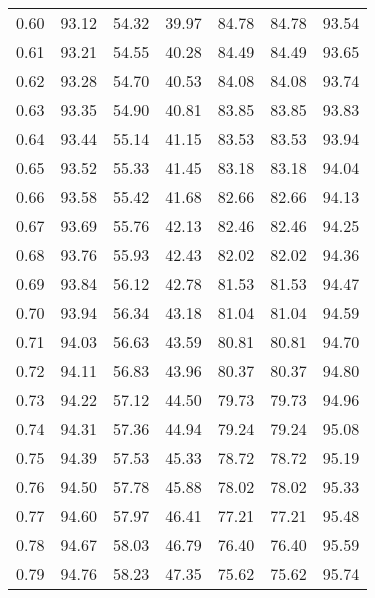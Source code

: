 \begin{tabular}{|c|c|c|c|c|c|c|}
      0.60 &     93.12 &     54.32 &      39.97 &   84.78 &      84.78 &         93.54 \\
      0.61 &     93.21 &     54.55 &      40.28 &   84.49 &      84.49 &         93.65 \\
      0.62 &     93.28 &     54.70 &      40.53 &   84.08 &      84.08 &         93.74 \\
      0.63 &     93.35 &     54.90 &      40.81 &   83.85 &      83.85 &         93.83 \\
      0.64 &     93.44 &     55.14 &      41.15 &   83.53 &      83.53 &         93.94 \\
      0.65 &     93.52 &     55.33 &      41.45 &   83.18 &      83.18 &         94.04 \\
      0.66 &     93.58 &     55.42 &      41.68 &   82.66 &      82.66 &         94.13 \\
      0.67 &     93.69 &     55.76 &      42.13 &   82.46 &      82.46 &         94.25 \\
      0.68 &     93.76 &     55.93 &      42.43 &   82.02 &      82.02 &         94.36 \\
      0.69 &     93.84 &     56.12 &      42.78 &   81.53 &      81.53 &         94.47 \\
      0.70 &     93.94 &     56.34 &      43.18 &   81.04 &      81.04 &         94.59 \\
      0.71 &     94.03 &     56.63 &      43.59 &   80.81 &      80.81 &         94.70 \\
      0.72 &     94.11 &     56.83 &      43.96 &   80.37 &      80.37 &         94.80 \\
      0.73 &     94.22 &     57.12 &      44.50 &   79.73 &      79.73 &         94.96 \\
      0.74 &     94.31 &     57.36 &      44.94 &   79.24 &      79.24 &         95.08 \\
      0.75 &     94.39 &     57.53 &      45.33 &   78.72 &      78.72 &         95.19 \\
      0.76 &     94.50 &     57.78 &      45.88 &   78.02 &      78.02 &         95.33 \\
      0.77 &     94.60 &     57.97 &      46.41 &   77.21 &      77.21 &         95.48 \\
      0.78 &     94.67 &     58.03 &      46.79 &   76.40 &      76.40 &         95.59 \\
      0.79 &     94.76 &     58.23 &      47.35 &   75.62 &      75.62 &         95.74 \\

\end{tabular}
